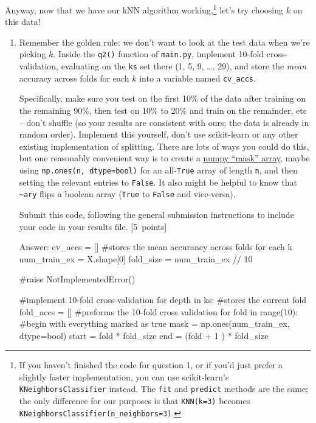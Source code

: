 \documentclass{article}
\newcommand{\blu}[1]{{\textcolor{blu}{#1}}}
\newcommand{\gre}[1]{\textcolor{gre}{#1}}
\newcommand\ans[1]{\par\gre{Answer: #1}}
\let\ask\blu
\newcommand\pts[1]{\textcolor{pointscolour}{[#1~points]}}
\begin{document}
    Anyway, now that we have our kNN algorithm working,\footnote{If you haven't finished the code for question 1, or if you'd just prefer a slightly faster implementation, you can use scikit-learn's \texttt{KNeighborsClassifier} instead. The \texttt{fit} and \texttt{predict} methods are the same; the only difference for our purposes is that \texttt{KNN(k=3)} becomes \texttt{KNeighborsClassifier(n\_neighbors=3)}.} let's try choosing $k$ on this data!

    \begin{enumerate}
        \item Remember the golden rule: we don't want to look at the test data when we're picking $k$. Inside the \texttt{q2()} function of \texttt{main.py}, implement 10-fold cross-validation, evaluating on the \texttt{ks} set there (1, 5, 9, \dots, 29), and store the \emph{mean} accuracy across folds for each $k$ into a variable named \texttt{cv\_accs}.

        Specifically, make sure you test on the first 10\% of the data after training on the remaining 90\%, then test on 10\% to 20\% and train on the remainder, etc -- don't shuffle (so your results are consistent with ours; the data is already in random order). Implement this yourself, don't use scikit-learn or any other existing implementation of splitting. There are lots of ways you could do this, but one reasonably convenient way is to create a \href{https://numpy.org/doc/stable/user/basics.indexing.html#boolean-or-mask-index-arrays}{numpy ``mask'' array}, maybe using \texttt{np.ones(n, dtype=bool)} for an all-\texttt{True} array of length \texttt{n}, and then setting the relevant entries to \texttt{False}. It also might be helpful to know that \texttt{\textasciitilde ary} flips a boolean array (\texttt{True} to \texttt{False} and vice-versa).

        \ask{Submit this code}, following the general submission instructions to include your code in your results file. \pts{5}

        \ans{cv_accs = [] #stores the mean accurancy across folds for each k 
    num_train_ex = X.shape[0]
    fold_size = num_train_ex // 10
    
    #raise NotImplementedError()
    
    #implement 10-fold cross-validation
    for depth in ks:
        #stores the current fold
        fold_accs = []
        #preforms the 10-fold cross validation
        for fold in range(10):
            #begin with everything marked as true
            mask = np.ones(num_train_ex, dtype=bool)
            start = fold * fold_size
            end = (fold  + 1 ) * fold_size

}
\end{enumerate}
\end{document}
